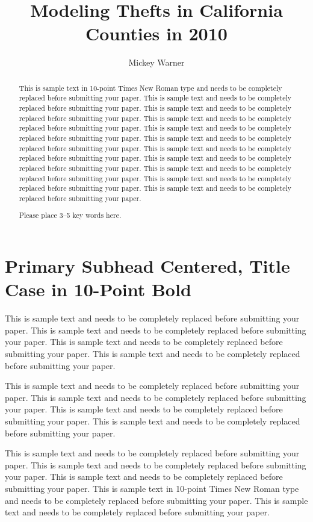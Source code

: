 \documentclass{asaproc}
\title{Modeling Thefts in California Counties in 2010}
\author{Mickey Warner}
\begin{document}
\maketitle


\begin{abstract}
This is sample text in 10-point Times New Roman type and needs to be completely replaced before submitting your paper. This is sample text and needs to be completely replaced before submitting your paper. This is sample text and needs to be completely replaced before submitting your paper. This is sample text and needs to be completely replaced before submitting your paper. This is sample text and needs to be completely replaced before submitting your paper. This is sample text and needs to be completely replaced before submitting your paper. This is sample text and needs to be completely replaced before submitting your paper. This is sample text and needs to be completely replaced before submitting your paper. This is sample text and needs to be completely replaced before submitting your paper. This is sample text and needs to be completely replaced before submitting your paper. This is sample text and needs to be completely replaced before submitting your paper.
\begin{keywords}
Please place 3--5 key words here.
\end{keywords}
\end{abstract}


\section{Primary Subhead Centered, Title Case in 10-Point Bold}

This is sample text and needs to be completely replaced before submitting your paper. This is sample text and needs to be completely replaced before submitting your paper. This is sample text and needs to be completely replaced before submitting your paper. This is sample text and needs to be completely replaced before submitting your paper.

This is sample text and needs to be completely replaced before submitting your paper. This is sample text and needs to be completely replaced before submitting your paper.  This is sample text and needs to be completely replaced before submitting your paper. This is sample text and needs to be completely replaced before submitting your paper.

This is sample text and needs to be completely replaced before submitting your paper. This is sample text and needs to be completely replaced before submitting your paper. This is sample text and needs to be completely replaced before submitting your paper. This is sample text in 10-point Times New Roman type and needs to be completely replaced before submitting your paper. This is sample text and needs to be completely replaced before submitting your paper.
\end{document}
